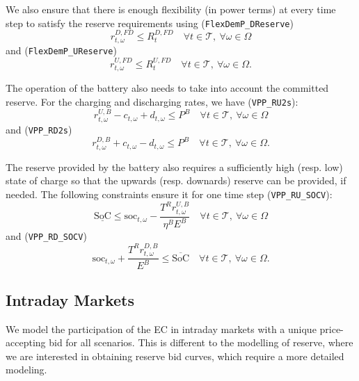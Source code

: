 \documentclass{article}
\newcommand{\SOC}{\text{SoC}}
\newcommand{\soc}{\text{soc}}
\begin{document}
We also ensure that there is enough flexibility (in power terms) at every time step to satisfy the reserve requirements using (\verb|FlexDemP_DReserve|)
\begin{equation} \label{EQ:FlexDemP_DReserve}
	r^{D, FD}_{t, \omega} \leq R^{D, FD}_t \quad \forall t \in \mathcal{T}, \ \forall \omega \in \Omega
\end{equation}
and (\verb|FlexDemP_UReserve|)
\begin{equation} \label{EQ:FlexDemP_UReserve}
	r^{U, FD}_{t, \omega} \leq R^{U, FD}_t \quad \forall t \in \mathcal{T}, \ \forall \omega \in \Omega.
\end{equation}

The operation of the battery also needs to take into account the committed reserve. For the charging and discharging rates, we have (\verb|VPP_RU2s|):
\begin{equation} \label{EQ:VPP_RU2s}
	r^{U, B} _{t, \omega} - c_{t, \omega} + d_{t, \omega}  \leq P^B \quad \forall t \in \mathcal{T}, \ \forall \omega \in \Omega
\end{equation}
and (\verb|VPP_RD2s|)
\begin{equation} \label{EQ:VPP_RD2s}
	r^{D, B}_{t, \omega} + c_{t, \omega} - d_{t, \omega} \leq P^B \quad \forall t \in \mathcal{T}, \ \forall \omega \in \Omega.
\end{equation}

The reserve provided by the battery also requires a sufficiently high (resp. low) state of charge so that the upwards (resp. downards) reserve can be provided, if needed. The following constraints ensure it for one time step (\verb|VPP_RU_SOCV|):
\begin{equation} \label{EQ:VPP_RU_SOCV}
	\underline{\SOC} \leq \soc_{t, \omega} - \frac{T^R r^{U, B}_{t, \omega}}{\eta^B E^B} \quad \forall t \in \mathcal{T}, \ \forall \omega \in \Omega
\end{equation}
and  (\verb|VPP_RD_SOCV|)
\begin{equation} \label{EQ:VPP_RD_SOCV}
	\soc_{t, \omega} + \frac{T^R r^{D, B}_{t, \omega} }{E^B} \leq \overline{\SOC} \quad \forall t \in \mathcal{T}, \ \forall \omega \in \Omega.
\end{equation}

\subsection{Intraday Markets}

We model the participation of the EC in intraday markets with a unique price-accepting bid for all scenarios. This is different to the modelling of reserve, where we are interested in obtaining reserve bid curves, which require a more detailed modeling.
\end{document}
